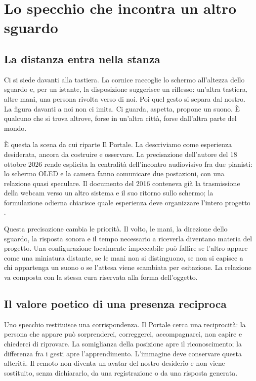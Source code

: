 \chapter{Lo specchio che incontra un altro sguardo}\label{ch:thesis}

\section{La distanza entra nella stanza}
Ci si siede davanti alla tastiera. La cornice raccoglie lo schermo all'altezza dello sguardo e, per un istante, la disposizione suggerisce un riflesso: un'altra tastiera, altre mani, una persona rivolta verso di noi. Poi quel gesto si separa dal nostro. La figura davanti a noi non ci imita. Ci guarda, aspetta, propone un suono. È qualcuno che si trova altrove, forse in un'altra città, forse dall'altra parte del mondo.

È questa la scena da cui riparte Il Portale. La descriviamo come esperienza desiderata, ancora da costruire e osservare. La precisazione dell'autore del 18 ottobre 2026 rende esplicita la centralità dell'incontro audiovisivo fra due pianisti: lo schermo OLED e la camera fanno comunicare due postazioni, con una relazione quasi speculare. Il documento del 2016 conteneva già la trasmissione della webcam verso un altro sistema e il suo ritorno sullo schermo; la formulazione odierna chiarisce quale esperienza deve organizzare l'intero progetto \cite[p.~2]{terzi_peeragogy_2016}.

Questa precisazione cambia le priorità. Il volto, le mani, la direzione dello sguardo, la risposta sonora e il tempo necessario a riceverla diventano materia del progetto. Una configurazione localmente impeccabile può fallire se l'altro appare come una miniatura distante, se le mani non si distinguono, se non si capisce a chi appartenga un suono o se l'attesa viene scambiata per esitazione. La relazione va composta con la stessa cura riservata alla forma dell'oggetto.

\section{Il valore poetico di una presenza reciproca}
Uno specchio restituisce una corrispondenza. Il Portale cerca una reciprocità: la persona che appare può sorprenderci, correggerci, accompagnarci, non capire e chiederci di riprovare. La somiglianza della posizione apre il riconoscimento; la differenza fra i gesti apre l'apprendimento. L'immagine deve conservare questa alterità. Il remoto non diventa un avatar del nostro desiderio e non viene sostituito, senza dichiararlo, da una registrazione o da una risposta generata.

